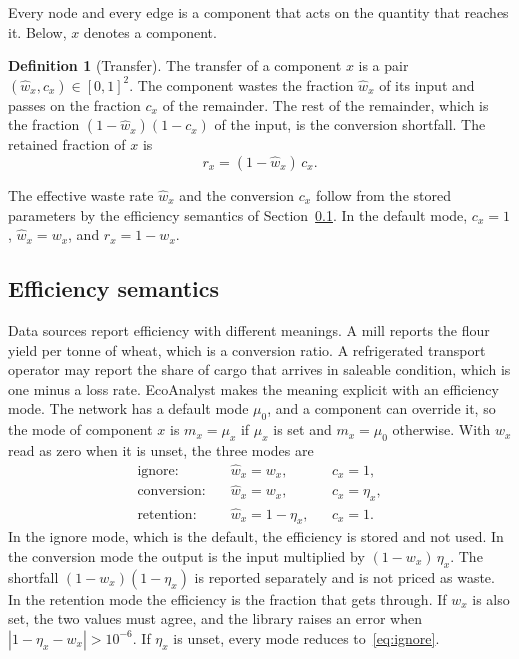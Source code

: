 \documentclass[12pt]{article}
\theoremstyle{plain}
\theoremstyle{definition}
\newtheorem{definition}{Definition}
\begin{document}
Every node and every edge is a component that acts on the quantity that reaches it. Below, $x$ denotes a component.

\begin{definition}[Transfer]\label{def:transfer}
The transfer of a component $x$ is a pair $(\hat w_x,c_x)\in[0,1]^2$. The component wastes the fraction $\hat w_x$ of its input and passes on the fraction $c_x$ of the remainder. The rest of the remainder, which is the fraction $(1-\hat w_x)(1-c_x)$ of the input, is the conversion shortfall. The retained fraction of $x$ is
\begin{equation}\label{eq:retained}
    r_x=(1-\hat w_x)\,c_x .
\end{equation}
\end{definition}

The effective waste rate $\hat w_x$ and the conversion $c_x$ follow from the stored parameters by the efficiency semantics of Section~\ref{sec:efficiency}. In the default mode, $c_x=1$, $\hat w_x=w_x$, and $r_x=1-w_x$.

\subsection{Efficiency semantics}\label{sec:efficiency}

Data sources report efficiency with different meanings. A mill reports the flour yield per tonne of wheat, which is a conversion ratio. A refrigerated transport operator may report the share of cargo that arrives in saleable condition, which is one minus a loss rate. EcoAnalyst makes the meaning explicit with an efficiency mode. The network has a default mode $\mu_0$, and a component can override it, so the mode of component $x$ is $m_x=\mu_x$ if $\mu_x$ is set and $m_x=\mu_0$ otherwise. With $w_x$ read as zero when it is unset, the three modes are
\begin{align}
    \text{ignore:}\quad & \hat w_x=w_x, && c_x=1, \label{eq:ignore}\\
    \text{conversion:}\quad & \hat w_x=w_x, && c_x=\eta_x, \label{eq:conversion}\\
    \text{retention:}\quad & \hat w_x=1-\eta_x, && c_x=1. \label{eq:retention}
\end{align}
In the ignore mode, which is the default, the efficiency is stored and not used. In the conversion mode the output is the input multiplied by $(1-w_x)\,\eta_x$. The shortfall $(1-w_x)(1-\eta_x)$ is reported separately and is not priced as waste. In the retention mode the efficiency is the fraction that gets through. If $w_x$ is also set, the two values must agree, and the library raises an error when $|1-\eta_x-w_x|>10^{-6}$. If $\eta_x$ is unset, every mode reduces to~\eqref{eq:ignore}.
\end{document}
